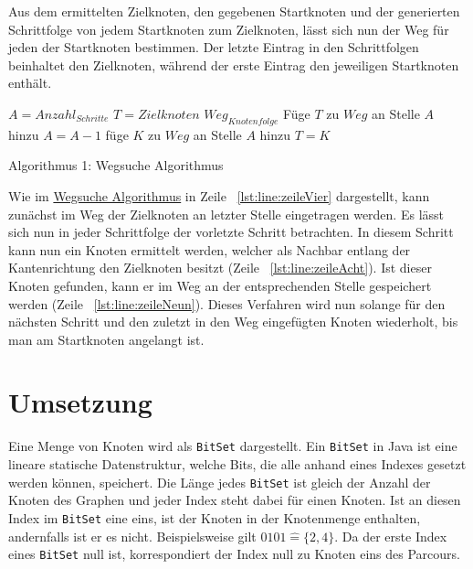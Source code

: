 \documentclass[a4paper,10pt,ngerman]{scrartcl}
\begin{document}
    Aus dem ermittelten Zielknoten, den gegebenen Startknoten und
    der generierten Schrittfolge von jedem Startknoten zum Zielknoten,
    lässt sich nun der Weg für jeden der Startknoten bestimmen.
    Der letzte Eintrag in den Schrittfolgen beinhaltet den Zielknoten,
    während der erste Eintrag den jeweiligen Startknoten enthält.

    \begin{algorithm}
        \begin{algorithmic}[1]
            \State $A = Anzahl_{Schritte}$
            \State $T = Zielknoten$
            \State $Weg_{Knotenfolge}$
            \State Füge $T$ zu $Weg$ an Stelle $A$ hinzu \label{lst:line:zeileVier}
                \State $A = A -1$
                        \label{lst:line:zeileAcht}
                        \State füge $K$ zu $Weg$ an Stelle $A$ hinzu \label{lst:line:zeileNeun}
                        \State $T = K$
                    \EndIf
                \EndFor
            \EndFor
        \end{algorithmic}
        \caption{Algorithmus 1: Wegsuche Algorithmus}
        \label{alg:Algorithm1}
    \end{algorithm}

    Wie im \hyperref[alg:Algorithm1]{Wegsuche Algorithmus} in Zeile ~\ref{lst:line:zeileVier} dargestellt,
    kann zunächst im Weg der Zielknoten an letzter Stelle eingetragen werden.
    Es lässt sich nun in jeder Schrittfolge der vorletzte Schritt betrachten.
    In diesem Schritt kann nun ein Knoten ermittelt werden,
    welcher als Nachbar entlang der Kantenrichtung den Zielknoten besitzt (Zeile ~\ref{lst:line:zeileAcht}).
    Ist dieser Knoten gefunden,
    kann er im Weg an der entsprechenden Stelle gespeichert werden (Zeile ~\ref{lst:line:zeileNeun}).
    Dieses Verfahren wird nun solange für den nächsten Schritt und den zuletzt in den Weg eingefügten Knoten wiederholt,
    bis man am Startknoten angelangt ist.


    \section{Umsetzung}\label{sec:umsetzung}

    Eine Menge von Knoten wird als \texttt{BitSet} dargestellt.
    Ein \texttt{BitSet} in Java ist eine lineare statische Datenstruktur,
    welche Bits, die alle anhand eines Indexes gesetzt werden können, speichert.
    Die Länge jedes \texttt{BitSet} ist gleich der Anzahl der Knoten des Graphen
    und jeder Index steht dabei für einen Knoten.
    Ist an diesen Index im \texttt{BitSet} eine eins,
    ist der Knoten in der Knotenmenge enthalten, andernfalls ist er es nicht.
    Beispielsweise gilt $0101 \widehat{=} \{2, 4\}$.
    Da der erste Index eines \texttt{BitSet} null ist,
    korrespondiert der Index null zu Knoten eins des Parcours.
\end{document}
